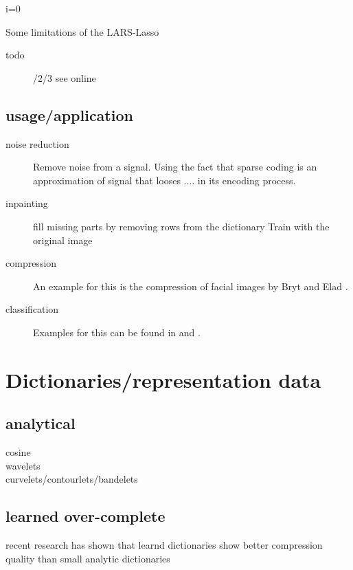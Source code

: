 \begin{algorithm}
\begin{algorithmic}
\STATE i=0
\end{algorithmic}
\end{algorithm}

Some limitations of the LARS-Lasso
\begin{description}
 \item[todo] /2/3 see online
\end{description}


\subsection{usage/application}
\begin{description}
\item[noise reduction]
Remove noise from a signal. Using the fact that sparse coding 
is an approximation of signal that looses .... in its encoding process. 
\cite{Elad2006}

\item[inpainting]
fill missing parts by removing rows from the dictionary
Train with the original image
\cite{mairal08sparse}

\item[compression] An example for this is the compression of facial images by Bryt and Elad \cite{Bryt2008}.
\item[classification] Examples for this can be found in \cite{Mairal2008b} and \cite{Bar2009}.
\end{description}



\section{Dictionaries/representation data}
\subsection{analytical}
\begin{description}
 \item[cosine]
 \item[wavelets]
 \item[curvelets/contourlets/bandelets]
\end{description}

\subsection{learned over-complete}
recent research has shown that learnd dictionaries show better compression quality than small analytic dictionaries \cite{Aharon2006} \cite{Chen1998} 


